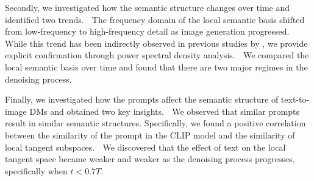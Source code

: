 
Secondly, we investigated how the semantic structure changes over time and identified two trends.
\textcircled{} The frequency domain of the local semantic basis shifted from low-frequency to high-frequency detail as image generation progressed. 
While this trend has been indirectly observed in previous studies by \citet{choi2022perception}, we provide explicit confirmation through power spectral density analysis.
\textcircled{} We compared the local semantic basis over time and found that there are two major regimes in the denoising process. 

Finally, we investigated how the prompts affect the semantic structure of text-to-image DMs and obtained two key insights.
\textcircled{} We observed that similar prompts result in similar semantic structures. Specifically, we found a positive correlation between the similarity of the prompt in the CLIP model and the similarity of local tangent subspaces.
\textcircled{} We discovered that the effect of text on the local tangent space became weaker and weaker as the denoising process progresses, specifically when $t<0.7T$.


